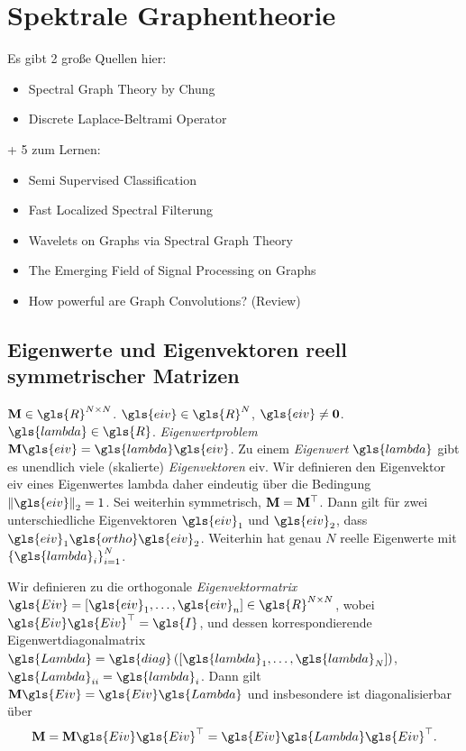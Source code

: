 \section{Spektrale Graphentheorie}
\label{spektrale_graphentheorie}

Es gibt 2 große Quellen hier:
\begin{itemize}
  \item Spectral Graph Theory by Chung
  \item Discrete Laplace-Beltrami Operator
\end{itemize}
+ 5 zum Lernen:
\begin{itemize}
  \item Semi Supervised Classification
  \item Fast Localized Spectral Filterung
  \item Wavelets on Graphs via Spectral Graph Theory
  \item The Emerging Field of Signal Processing on Graphs
  \item How powerful are Graph Convolutions? (Review)
\end{itemize}

\subsection{Eigenwerte und Eigenvektoren reell symmetrischer Matrizen}
\label{eigenwerte_symmetrischer_matrizen}


$\ma{M} \in \gls{R}^{N \times N}$.
$\gls{eiv} \in \gls{R}^{N}$, $\gls{eiv} \neq \mathbf{0}$.
$\gls{lambda} \in \gls{R}$.
\emph{Eigenwertproblem} $\ma{M}\gls{eiv} = \gls{lambda}\gls{eiv}$.
Zu einem \emph{Eigenwert} $\gls{lambda}$ gibt es unendlich viele (skalierte) \emph{Eigenvektoren} \gls{eiv}.
Wir definieren den Eigenvektor \gls{eiv} eines Eigenwertes \gls{lambda} daher eindeutig über die Bedingung $\left\|\gls{eiv}\right\|_2 = 1$.
Sei  weiterhin symmetrisch, \dhe{} $\mathbf{M} = \mathbf{M}^{\top}$.
Dann gilt für zwei unterschiedliche Eigenvektoren $\gls{eiv}_1$ und $\gls{eiv}_2$, dass $\gls{eiv}_1 \gls{ortho} \gls{eiv}_2$.
Weiterhin hat  genau $N$ reelle Eigenwerte mit ${\left\{\gls{lambda}_i\right\}}_{i=1}^N$.

Wir definieren zu  die orthogonale \emph{Eigenvektormatrix} $\gls{Eiv} = \left[\gls{eiv}_1, \ldots, \gls{eiv}_n\right] \in \gls{R}^{N \times N}$, wobei $\gls{Eiv}\gls{Eiv}^{\top}=\gls{I}$, und dessen korrespondierende Eigenwertdiagonalmatrix $\gls{Lambda} = \gls{diag}\left(\left[\gls{lambda}_1, \ldots, \gls{lambda}_N\right]\right)$, \dhe{} $\gls{Lambda}_{ii} = \gls{lambda}_i$.
Dann gilt $\ma{M}\gls{Eiv} = \gls{Eiv}\gls{Lambda}$ und insbesondere ist  diagonalisierbar über
\begin{equation}
  \ma{M} = \ma{M}\gls{Eiv}\gls{Eiv}^{\top} = \gls{Eiv}\gls{Lambda}\gls{Eiv}^{\top}.
\end{equation}

